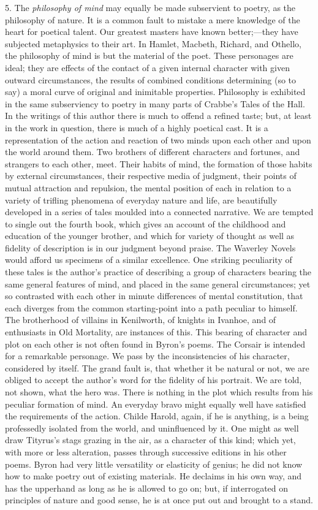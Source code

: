 5. The \emph{philosophy of mind} may equally be made subservient to
poetry, as the philosophy of nature. It is a common fault to mistake a
mere knowledge of the heart for poetical talent. Our greatest masters
have known better;—they have subjected metaphysics to their art. In
Hamlet, Macbeth, Richard, and Othello, the philosophy of mind is but
the material of the poet. These personages are ideal; they are effects
of the contact of a given internal character with given outward
circumstances, the results of combined conditions determining (so to
say) a moral curve of original and inimitable properties. Philosophy
is exhibited in the same subserviency to poetry in many parts of
Crabbe's Tales of the Hall. In the writings of this author there is
much to offend a refined taste; but, at least in the work in
question, there is much of a highly poetical cast. It is a
representation of the action and reaction of two minds upon each other
and upon the world around them. Two brothers of different characters
and fortunes, and strangers to each other, meet. Their habits of mind,
the formation of those habits by external circumstances, their
respective media of judgment, their points of mutual attraction and
repulsion, the mental position of each in relation to a variety of
trifling phenomena of everyday nature and life, are beautifully
developed in a series of tales moulded into a connected narrative. We
are tempted to single out the fourth book, which gives an account of
the childhood and education of the younger brother, and which for
variety of thought as well as fidelity of description is in our
judgment beyond praise. The Waverley Novels would afford us specimens
of a similar excellence. One striking peculiarity of these tales is
the author's practice of describing a group of characters bearing the
same general features of mind, and placed in the same general
circumstances; yet so contrasted with each other in minute differences
of mental constitution, that each diverges from the common
starting-point into a path peculiar to himself. The brotherhood of
villains in Kenilworth, of knights in Ivanhoe, and of enthusiasts in
Old Mortality, are instances of this. This bearing of character and
plot on each other is not often found in Byron's poems. The Corsair is
intended for a remarkable personage. We pass by the inconsistencies of
his character, considered by itself. The grand fault is, that whether
it be natural or not, we are obliged to accept the author's word for
the fidelity of his portrait. We are told, not shown, what the hero
was. There is nothing in the plot which results from his peculiar
formation of mind. An everyday bravo might equally well have
satisfied the requirements of the action. Childe Harold, again, if he
is anything, is a being professedly isolated from the world, and
uninfluenced by it. One might as well draw Tityrus's stags grazing in
the air, as a character of this kind; which yet, with more or less
alteration, passes through successive editions in his other poems.
Byron had very little versatility or elasticity of genius; he did not
know how to make poetry out of existing materials. He declaims in his
own way, and has the upperhand as long as he is allowed to go on; but,
if interrogated on principles of nature and good sense, he is at once
put out and brought to a stand.

